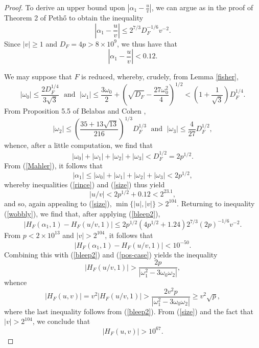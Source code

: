 \begin{proof}
To derive an upper bound upon $\left| \alpha_1 - \frac{u}{v} \right|$, we can argue as in the proof of Theorem 2 of Peth\H{o} \cite{Pet2} to obtain the inequality
\begin{equation} \label{tombstone}
\left| \alpha_1 - \frac{u}{v} \right| \leq 2^{7/3} D_F^{-1/6} v^{-2}.
\end{equation}
Since $|v| \geq 1$ and $D_F =4p > 8 \times 10^9$, we thus have that 
\begin{equation} \label{rince}
\left| \alpha_1 - \frac{u}{v} \right| < 0.12.
\end{equation}

We may suppose that $F$ is reduced, whereby, crudely, from Lemma \ref{fisher},
$$
|\omega_0| \leq \frac{2D_F^{1/4}}{3 \sqrt{3}} \; \mbox{ and } \; |\omega_1| \leq  \frac{3\omega_0}{2}+  \left( \sqrt{D_F}-\frac{27\omega_0^2}{4} \right)^{1/2}
< \left( 1 + \frac{1}{\sqrt{3}} \right) D_F^{1/4}.
$$
From Proposition 5.5 of Belabas and Cohen \cite{BeCo}, 
$$
|\omega_2| \leq \left( \frac{35 + 13 \sqrt{13}}{216} \right)^{1/3} D_F^{1/3} \; \mbox{ and } \;
|\omega_3| \leq \frac{4}{27} D_F^{1/2},
$$
whence, after a little computation, we find that
$$
|\omega_0|+|\omega_1|+|\omega_2|+|\omega_3| < D_F^{1/2} = 2 p^{1/2}.
$$
From (\ref{Mahler}), it follows that
$$
|\alpha_1| \leq |\omega_0|+|\omega_1|+|\omega_2|+|\omega_3| < 2 p^{1/2},
$$
whereby inequalities (\ref{rince}) and (\ref{size}) thus yield 
$$
|u/v| < 2 p^{1/2} + 0.12 < 2^{23.1},
$$
and so, again appealing to (\ref{size}), $\min \{ |u|, |v| \} > 2^{104}$. Returning to inequality (\ref{wobbly}), we find that, after applying (\ref{bleep2}),
$$
\left| H_F (\alpha_1,1) - H_F (u/v,1) \right| \leq 2 p^{1/2}  \left( 4 p^{1/2} + 1.24 \right) 2^{7/3} (2 p)^{-1/6} v^{-2}.
$$
From $p < 2 \times 10^{13}$ and $|v| > 2^{104}$, it follows that
$$
\left| H_F (\alpha_1,1) - H_F (u/v,1) \right| < 10^{-50}.
$$
Combining this with (\ref{bleep2}) and (\ref{pos-case}) yields the inequality
$$
\left| H_F(u/v,1) \right| >  \frac{2 p}{|\omega_1^2-3\omega_0 \omega_2|},
$$
whence
$$
 |H_F(u,v)| = v^2 \left| H_F(u/v,1) \right| > \frac{2 v^2 p}{|\omega_1^2-3\omega_0 \omega_2|} \geq v^2 \sqrt{p},
$$
where the last inequality follows from  (\ref{bleep2}).
From  (\ref{size}) and the fact that $|v| > 2^{104}$, we conclude that
$$
 |H_F(u,v)|> 10^{67}.
$$


\end{proof}
